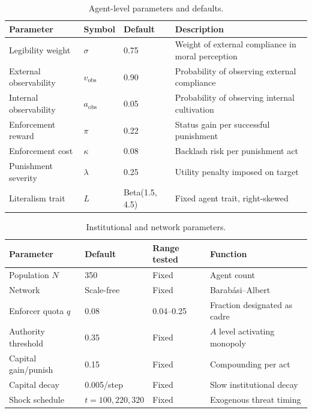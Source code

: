 \documentclass[12pt]{article}
\begin{document}
\begin{table}[ht]
\centering
\caption{Agent-level parameters and defaults.}
\label{tab:agent-params}
\begin{tabular}{llll}
\toprule
Parameter & Symbol & Default & Description \\
\midrule
Legibility weight & $\sigma$ & 0.75 & Weight of external compliance in moral perception \\
External observability & $v_{\text{obs}}$ & 0.90 & Probability of observing external compliance \\
Internal observability & $a_{\text{obs}}$ & 0.05 & Probability of observing internal cultivation \\
Enforcement reward & $\pi$ & 0.22 & Status gain per successful punishment \\
Enforcement cost & $\kappa$ & 0.08 & Backlash risk per punishment act \\
Punishment severity & $\lambda$ & 0.25 & Utility penalty imposed on target \\
Literalism trait & $L$ & Beta(1.5, 4.5) & Fixed agent trait, right-skewed \\
\bottomrule
\end{tabular}
\end{table}

\begin{table}[ht]
\centering
\caption{Institutional and network parameters.}
\label{tab:inst-params}
\begin{tabular}{llll}
\toprule
Parameter & Default & Range tested & Function \\
\midrule
Population $N$ & 350 & Fixed & Agent count \\
Network & Scale-free & Fixed & Barab\'asi--Albert \\
Enforcer quota $q$ & 0.08 & 0.04--0.25 & Fraction designated as cadre \\
Authority threshold & 0.35 & Fixed & $A$ level activating monopoly \\
Capital gain/punish & 0.15 & Fixed & Compounding per act \\
Capital decay & 0.005/step & Fixed & Slow institutional decay \\
Shock schedule & $t = 100, 220, 320$ & Fixed & Exogenous threat timing \\
\bottomrule
\end{tabular}
\end{table}
\end{document}
